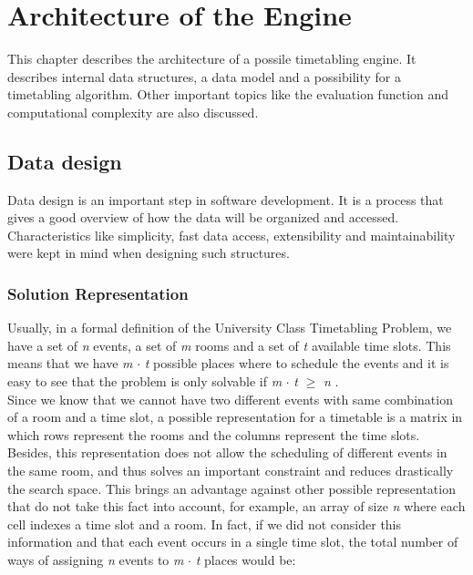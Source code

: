 

\chapter{Architecture of the Engine}

\label{engine} %


This chapter describes the architecture of a possile timetabling engine. It describes internal data structures, a data model and a possibility for a timetabling algorithm. Other important topics like the evaluation function and computational complexity are also discussed.

\section{Data design}
Data design is an important step in software development. It is a process that gives a good overview of how the data will be organized and accessed. Characteristics like simplicity, fast data access, extensibility and maintainability were kept in mind when designing such structures.    
\subsection{Solution Representation}


Usually, in a formal definition of the University Class Timetabling Problem, we have a set of \textit{n} events, a set of \textit{m} rooms and a set of \textit{t} available time slots. This means that we have \textit{m} $\cdot$  \textit{t} possible places where to schedule the events and it is easy to see that the problem is only solvable if \textit{m} $\cdot$  \textit{t} $\geq$ \textit{n} .\\
Since we know that we cannot have two different events with same combination of a room and a time slot, a possible representation for a timetable is a  matrix in which rows represent the rooms and the columns represent the time slots. Besides, this representation does not allow the scheduling of different events in the same room, and thus solves an important constraint and reduces drastically the search space. This brings an advantage against other possible representation that do not take this fact into account, for example, an array of size \textit{n} where each cell indexes a time slot and a room. In fact, if we did not consider this information and that each event occurs in a single time slot, the total number of ways of assigning \textit{n} events to \textit{m} $\cdot$ \textit{t} places would be:

